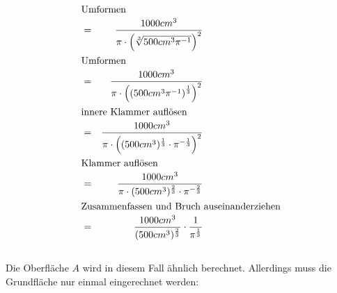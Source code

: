 \documentclass[10pt,a4paper,oneside,ngerman,numbers=noenddot]{scrartcl}
\begin{document}
\begin{alignat*}{2}
\intertext{Umformen}
&=& \frac{1000 cm^{3}}{\pi \cdot  \left(\sqrt[3]{500 cm^{3}\pi^{-1}} \right)^{2}} \\
\intertext{Umformen}
&=& \frac{1000 cm^{3}}{\pi \cdot  \left(\left(500 cm^{3}\pi^{-1}\right)^{\frac{1}{3}} \right)^{2}} \\
\intertext{innere Klammer auflösen}
&=& \frac{1000 cm^{3}}{\pi \cdot \left((500 cm^{3})^{\frac{1}{3}} \cdot \pi^{-\frac{1}{3}} \right)^{2}} \\
\intertext{Klammer auflösen}
&=& \frac{1000 cm^{3}}{\pi \cdot (500 cm^{3})^{\frac{2}{3}} \cdot \pi^{-\frac{2}{3}}} \\
\intertext{Zusammenfassen und Bruch auseinanderziehen}
&=& \frac{1000 cm^{3}}{(500 cm^{3})^{\frac{2}{3}} } \cdot \frac{1}{\pi^{\frac{1}{3}}}
\end{alignat*}
\subsection{} %
Die Oberfläche $A$ wird in diesem Fall ähnlich berechnet. Allerdings muss die Grundfläche nur einmal eingerechnet werden:\\
\end{document}
